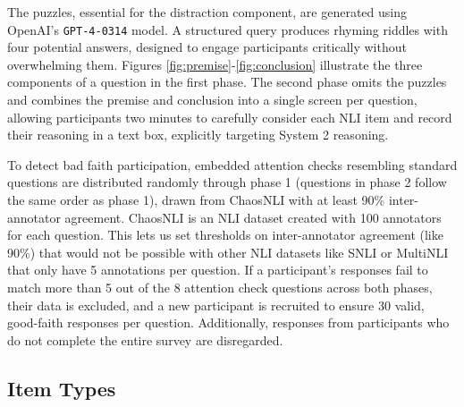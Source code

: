         The puzzles, essential for the distraction component, are generated using OpenAI's \texttt{GPT-4-0314} model. A structured query produces rhyming riddles with four potential answers, designed to engage participants critically without overwhelming them. Figures \ref{fig:premise}-\ref{fig:conclusion} illustrate the three components of a question in the first phase. The second phase omits the puzzles and combines the premise and conclusion into a single screen per question, allowing participants two minutes to carefully consider each NLI item and record their reasoning in a text box, explicitly targeting System 2 reasoning.
        
        To detect bad faith participation, embedded attention checks resembling standard questions are distributed randomly through phase 1 (questions in phase 2 follow the same order as phase 1), drawn from ChaosNLI \citep{nie_what_2020} with at least 90\% inter-annotator agreement. ChaosNLI is an NLI dataset created with 100 annotators for each question. This lets us set thresholds on inter-annotator agreement (like 90\%) that would not be possible with other NLI datasets like SNLI \citep{bowman_large_2015} or MultiNLI \citep{williams_broad-coverage_2018} that only have 5 annotations per question. If a participant's responses fail to match more than 5 out of the 8 attention check questions across both phases, their data is excluded, and a new participant is recruited to ensure 30 valid, good-faith responses per question. Additionally, responses from participants who do not complete the entire survey are disregarded.
        
    \subsection{Item Types}
    
